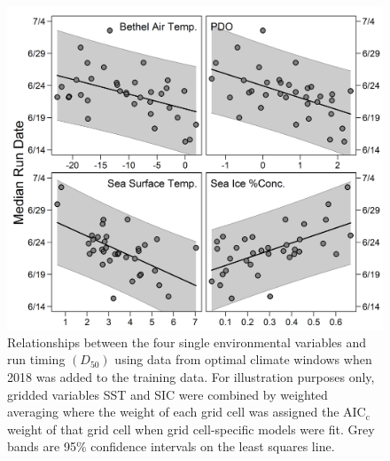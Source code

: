 \documentclass[12pt,]{book}
\theoremstyle{definition}
\theoremstyle{definition}
\theoremstyle{definition}
\theoremstyle{remark}
\begin{document}
\clearpage

\begin{figure}
  \centering
  \includegraphics{img/Ch2/relationships.png}
  \caption{Relationships between the four single environmental variables and run timing $\left(D_{50}\right)$ using data from optimal climate windows when 2018 was added to the training data. For illustration purposes only, gridded variables SST and SIC were combined by weighted averaging where the weight of each grid cell was assigned the $\text{AIC}_{\text{c}}$ weight of that grid cell when grid cell-specific models were fit. Grey bands are 95$\%$ confidence intervals on the least squares line.}
  \label{fig:relationships}
\end{figure}

\clearpage
\end{document}
